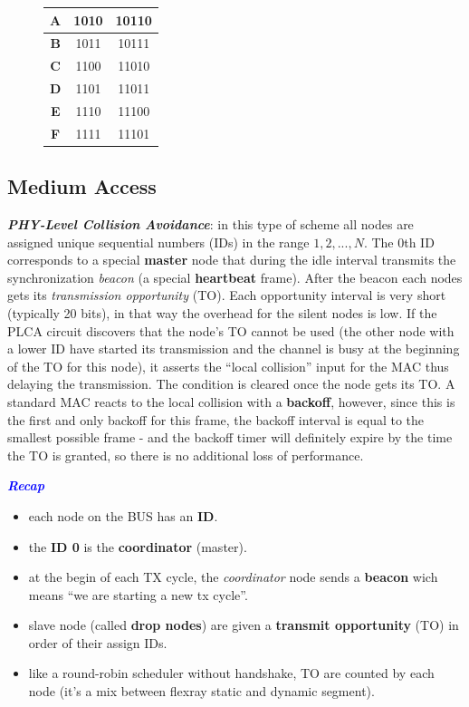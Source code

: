 \begin{figure}[h]
\begin{minipage}[t]{0.45\textwidth}
\begin{center}
\begin{tabular}{| c | c | c |}
                \textbf{A} & 1010 & 10110 \\ \hline
                \textbf{B} & 1011 & 10111 \\ \hline
                \textbf{C} & 1100 & 11010 \\ \hline
                \textbf{D} & 1101 & 11011 \\ \hline
                \textbf{E} & 1110 & 11100 \\ \hline
                \textbf{F} & 1111 & 11101 \\ \hline
            \end{tabular}
        \end{center}
    \end{minipage}
\end{figure}

\subsection{Medium Access}
\textbf{\textit{PHY-Level Collision Avoidance}}: in this type of scheme all nodes are assigned unique sequential numbers (IDs) in the range $1,2, ..., N$. The 0th ID corresponds to a special \textbf{master} node that during the idle interval transmits the synchronization \textit{beacon} (a special \textbf{heartbeat} frame). After the beacon each nodes gets its \textit{transmission opportunity} (TO). Each opportunity interval is very short (typically 20 bits), in that way the overhead for the silent nodes is low. If the PLCA circuit discovers that the node's TO cannot be used (the other node with a lower ID have started its transmission and the channel is busy at the beginning of the TO for this node), it asserts the ``local collision'' input for the MAC thus delaying the transmission. The condition is cleared once the node gets its TO. A standard MAC reacts to the local collision with a \textbf{backoff}, however, since this is the first and only backoff for this frame, the backoff interval is equal to the smallest possible frame - and the backoff timer will definitely expire by the time the TO is granted, so there is no additional loss of performance.
\begin{boxA}
    \textcolor{blue}{\textbf{\textit{Recap}}}
    \begin{itemize}[nosep]
        \item each node on the BUS has an \textbf{ID}.
        \item the \textbf{ID 0} is the \textbf{coordinator} (master).
        \item at the begin of each TX cycle, the \textit{coordinator} node sends a \textbf{beacon} wich means ``we are starting a new tx cycle''.
        \item slave node (called \textbf{drop nodes}) are given a \textbf{transmit opportunity} (TO) in order of their assign IDs.
        \item like a round-robin scheduler without handshake, TO are counted by each node (it's a mix between flexray static and dynamic segment).
    \end{itemize}
\end{boxA}

